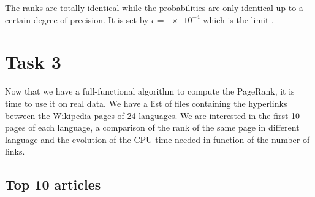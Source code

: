 The ranks are totally identical while the probabilities are only identical up to a certain degree of precision. It is set by $\epsilon = \num{e-4}$ which is the limit .
\section{Task 3}
Now that we have a full-functional algorithm to compute the PageRank, it is time to use it on real data. We have a list of files containing the hyperlinks between the Wikipedia pages of 24 languages. We are interested in the first 10 pages of each language, a comparison of the rank of the same page in different language and the evolution of the CPU time needed in function of the number of links.

\newpage
\subsection{Top 10 articles}
